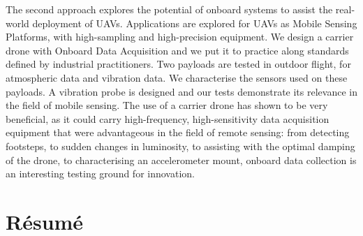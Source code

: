 The second approach explores the potential of  onboard systems to assist the real-world deployment of UAVs. Applications are explored for UAVs as Mobile Sensing Platforms, with high-sampling and high-precision equipment. We design a carrier drone with Onboard Data Acquisition and we put it to practice along standards defined by industrial practitioners. Two payloads are tested in outdoor flight, for atmospheric data and vibration data. We characterise the sensors used on these payloads. A vibration probe is designed and our tests demonstrate its relevance in the field of mobile sensing. The use of a carrier drone has shown to be very beneficial, as it could carry high-frequency, high-sensitivity data acquisition equipment that were advantageous in the field of remote sensing: from detecting footsteps, to sudden changes in luminosity, to assisting with the optimal damping of the drone, to characterising an accelerometer mount, onboard data collection is an interesting testing ground for innovation.




\chapter*{Résumé}



